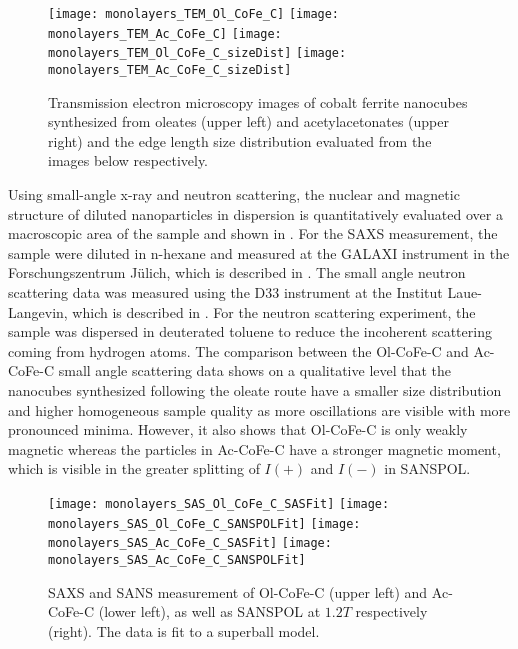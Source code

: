 \documentclass[\main/dresen_thesis.tex]{subfiles}
\begin{document}
    \begin{figure}[tb]
      \centering
      \hspace{0.3 cm}
      \texttt{[image: monolayers\_TEM\_Ol\_CoFe\_C]}
      \hspace{0.3 cm}
      \texttt{[image: monolayers\_TEM\_Ac\_CoFe\_C]}
      \texttt{[image: monolayers\_TEM\_Ol\_CoFe\_C\_sizeDist]}
      \texttt{[image: monolayers\_TEM\_Ac\_CoFe\_C\_sizeDist]}
      \caption{\label{fig:monolayers:nanoparticle:tem}Transmission electron microscopy images of cobalt ferrite nanocubes synthesized from oleates (upper left) and acetylacetonates (upper right) and the edge length size distribution evaluated from the images below respectively.}
    \end{figure}

    Using small-angle x-ray and neutron scattering, the nuclear and magnetic structure of diluted nanoparticles in dispersion is quantitatively evaluated over a macroscopic area of the sample and shown in .
    For the SAXS measurement, the sample were diluted in n-hexane and measured at the GALAXI instrument in the Forschungszentrum J\"ulich, which is described in .
    The small angle neutron scattering data was measured using the D33 instrument at the Institut Laue-Langevin, which is described in .
    For the neutron scattering experiment, the sample was dispersed in deuterated toluene to reduce the incoherent scattering coming from hydrogen atoms.
    The comparison between the Ol-CoFe-C and Ac-CoFe-C small angle scattering data shows on a qualitative level that the nanocubes synthesized following the oleate route have a smaller size distribution and higher homogeneous sample quality as more oscillations are visible with more pronounced minima.
    However, it also shows that Ol-CoFe-C is only weakly magnetic whereas the particles in Ac-CoFe-C have a stronger magnetic moment, which is visible in the greater splitting of $I(+)$ and $I(-)$ in SANSPOL.

    \begin{figure}[tb]
      \centering
      \texttt{[image: monolayers\_SAS\_Ol\_CoFe\_C\_SASFit]}
      \texttt{[image: monolayers\_SAS\_Ol\_CoFe\_C\_SANSPOLFit]}
      \texttt{[image: monolayers\_SAS\_Ac\_CoFe\_C\_SASFit]}
      \texttt{[image: monolayers\_SAS\_Ac\_CoFe\_C\_SANSPOLFit]}
      \caption{\label{fig:monolayers:nanoparticle:sas:AcOlCoFeC}SAXS and SANS measurement of Ol-CoFe-C (upper left) and Ac-CoFe-C (lower left), as well as SANSPOL at $1.2 \unit{T}$ respectively (right). The data is fit to a superball model.}
    \end{figure}
\end{document}

